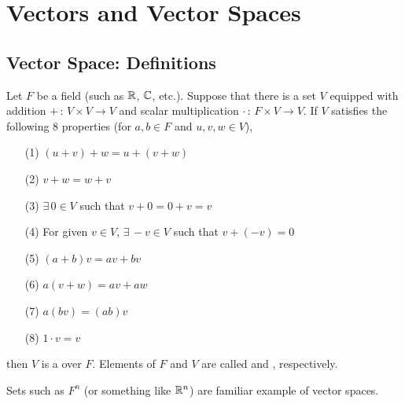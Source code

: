 \documentclass[a4paper, 10pt]{article}
\begin{document}
\section{Vectors and Vector Spaces}

\subsection{Vector Space: Definitions}

\begin{definition}
    Let $F$ be a field (such as $\mathbb{R}$, $\mathbb{C}$, etc.). Suppose that there is a set $V$ equipped with addition $+ \,:\, V \times V \rightarrow V$ and scalar multiplication $\cdot \,:\, F \times V \rightarrow V$. If $V$ satisfies the following 8 properties (for $a, b \in F$ and $u, v, w \in V$),
    \begin{itemize}
        \item[(1)] $(u + v) + w = u + (v + w)$
        \item[(2)] $v + w = w + v$
        \item[(3)] $\exists \, 0 \in V$ such that $v + 0 = 0 + v = v$
        \item[(4)] For given $v \in V$, $\exists \, -v \in V$ such that $v + (-v) = 0$
        \item[(5)] $(a + b)v = av + bv$
        \item[(6)] $a(v + w) = av + aw$
        \item[(7)] $a(bv) = (ab)v$
        \item[(8)] $1 \cdot v = v$
    \end{itemize}
    then $V$ is a  over $F$. Elements of $F$ and $V$ are called  and , respectively.
\end{definition}

Sets such as $F^{n}$ (or something like $\mathbb{R}^{n}$) are familiar example of vector spaces.

\seprule
\end{document}
